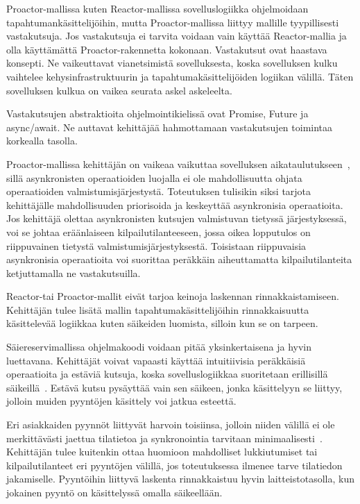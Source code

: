 \documentclass[finnish]{tktltiki2}
\theoremstyle{definition}
\theoremstyle{remark}
\begin{document}
Proactor-mallissa kuten Reactor-mallissa sovelluslogiikka ohjelmoidaan
tapahtumankäsittelijöihin, mutta Proactor-mallissa liittyy
mallille tyypillisesti vastakutsuja. Jos vastakutsuja ei tarvita
voidaan vain käyttää Reactor-mallia ja olla käyttämättä Proactor-rakennetta kokonaan.
Vastakutsut ovat haastava konsepti. Ne vaikeuttavat vianetsimistä
sovelluksesta, koska sovelluksen kulku vaihtelee kehysinfrastruktuurin
ja tapahtumakäsittelijöiden logiikan välillä. Täten sovelluksen
kulkua on vaikea seurata askel askeleelta.

Vastakutsujen abstraktioita ohjelmointikielissä ovat Promise, Future ja
async/await. Ne auttavat kehittäjää hahmottamaan vastakutsujen
toimintaa korkealla tasolla.

Proactor-mallissa kehittäjän on vaikeaa vaikuttaa sovelluksen
aikataulutukseen~\cite{pyarali_proactor_1997},
sillä asynkronisten operaatioiden luojalla
ei ole mahdollisuutta ohjata operaatioiden valmistumisjärjestystä.
Toteutuksen tulisikin siksi tarjota kehittäjälle mahdollisuuden
priorisoida ja keskeyttää asynkronisia operaatioita.
Jos kehittäjä olettaa asynkronisten kutsujen valmistuvan tietyssä järjestyksessä,
voi se johtaa eräänlaiseen kilpailutilanteeseen, jossa
oikea lopputulos on riippuvainen tietystä valmistumisjärjestyksestä.
Toisistaan riippuvaisia asynkronisia operaatioita
voi suorittaa peräkkäin aiheuttamatta kilpailutilanteita ketjuttamalla ne
vastakutsuilla.

Reactor-tai Proactor-mallit eivät tarjoa keinoja
laskennan rinnakkaistamiseen. Kehittäjän tulee lisätä
mallin tapahtumakäsittelijöihin rinnakkaisuutta käsittelevää
logiikkaa kuten säikeiden luomista, silloin kun se on tarpeen.

Säiereservimallissa ohjelmakoodi voidaan pitää yksinkertaisena ja
hyvin luettavana. Kehittäjät voivat vapaasti käyttää intuitiivisia
peräkkäisiä operaatioita ja estäviä kutsuja, koska sovelluslogiikkaa
suoritetaan erillisillä säikeillä~\cite{pyarali_proactor_1997}. Estävä kutsu pysäyttää vain
sen säikeen, jonka käsittelyyn se liittyy, jolloin muiden
pyyntöjen käsittely voi jatkua esteettä.

Eri asiakkaiden pyynnöt liittyvät harvoin toisiinsa,
jolloin niiden välillä ei ole merkittävästi jaettua tilatietoa ja
synkronointia tarvitaan minimaalisesti~\cite{pyarali_proactor_1997}.
Kehittäjän tulee kuitenkin ottaa huomioon mahdolliset lukkiutumiset
tai kilpailutilanteet eri pyyntöjen välillä, jos
toteutuksessa ilmenee tarve tilatiedon jakamiselle.
Pyyntöihin liittyvä laskenta rinnakkaistuu hyvin laitteistotasolla,
kun jokainen pyyntö on käsittelyssä omalla säikeellään.
\end{document}

